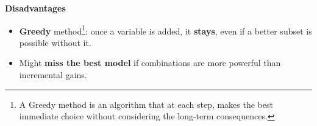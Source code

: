 \highspace
\begin{flushleft}
    \textcolor{Red2}{ \textbf{Disadvantages}}
\end{flushleft}
\begin{itemize}
    \item \textbf{Greedy} method\footnote{%
        A Greedy method is an algorithm that at each step, makes the best immediate choice without considering the long-term consequences.
    }: once a variable is added, it \textbf{stays}, even if a better subset is possible without it.
    \item Might \textbf{miss the best model} if combinations are more powerful than incremental gains.
\end{itemize}